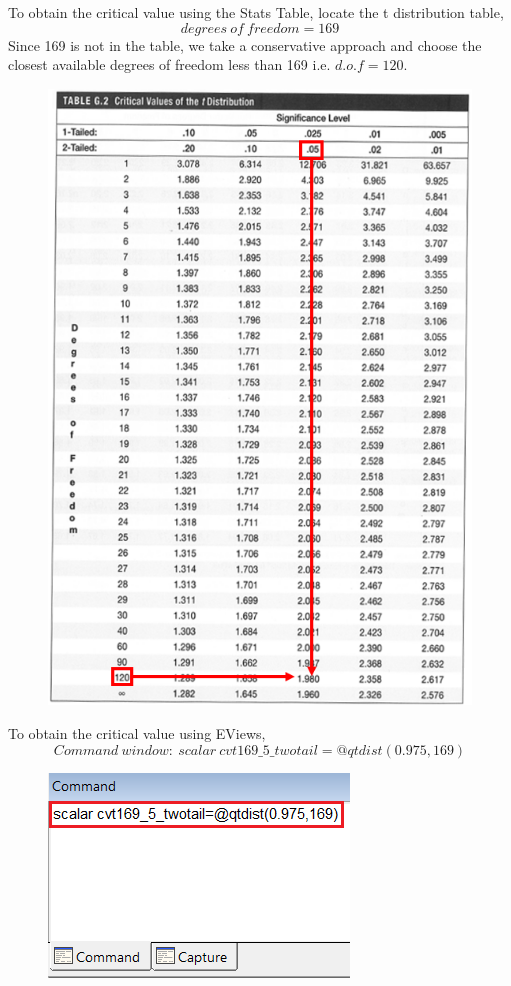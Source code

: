 \documentclass[12pt]{report}
\begin{document}
\noindent To obtain the critical value using the Stats Table, locate the t distribution table,
$$degrees\ of\ freedom = 169$$
\noindent Since 169 is not in the table, we take a conservative approach and choose the closest available degrees of freedom less than 169 i.e. $d.o.f=120$. 
\begin{figure}[H]
	\centering
	\includegraphics{q1_11}
\end{figure}
\vspace{-\baselineskip}
\noindent To obtain the critical value using EViews,
$$Command\ window:\ scalar\ cvt169\_5\_twotail=@qtdist(0.975,169)$$
\begin{figure}[H]
	\centering
	\includegraphics{q1_12}
\end{figure}
\end{document}
